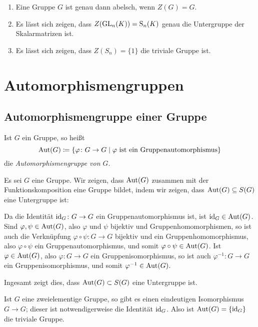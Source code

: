 \begin{bsp}
 \begin{enumerate}[leftmargin=*]
  \item
   Eine Gruppe $G$ ist genau dann abelsch, wenn $Z(G) = G$.
  \item
   Es lässt sich zeigen, dass $Z(\mathrm{GL}_n(K)) = \mathrm{S}_n(K)$ genau die Untergruppe der Skalarmatrizen ist.
  \item
   Es lässt sich zeigen, dass $Z(S_n) = \{1\}$ die triviale Gruppe ist.
 \end{enumerate}
\end{bsp}






\section{Automorphismengruppen}


\subsection{Automorphismengruppe einer Gruppe}
\begin{defi}
 Ist $G$ ein Gruppe, so heißt
 \[
  \mathrm{Aut}(G) \coloneqq \{\varphi \colon G \to G \mid \text{$\varphi$ ist ein Gruppenautomorphismus}\}
 \]
 die \emph{Automorphismengruppe von $G$}.
\end{defi}

Es sei $G$ eine Gruppe. Wir zeigen, dass $\mathrm{Aut}(G)$ zusammen mit der Funktionskomposition eine Gruppe bildet, indem wir zeigen, dass $\mathrm{Aut}(G) \subseteq S(G)$ eine Untergruppe ist:

Da die Identität $\mathrm{id}_G \colon G \to G$ ein Gruppenautomorphismus ist, ist $\mathrm{id}_G \in \mathrm{Aut}(G)$. Sind $\varphi, \psi \in \mathrm{Aut}(G)$, also $\varphi$ und $\psi$ bijektiv und Gruppenhomomorphismen, so ist auch die Verknüpfung $\varphi \circ \psi \colon G \to G$ bijektiv und ein Gruppenhomomorphismus, also $\varphi \circ \psi$ ein Gruppenautomorphismus, und somit $\varphi \circ \psi \in \mathrm{Aut}(G)$. Ist $\varphi \in \mathrm{Aut}(G)$, also $\varphi \colon G \to G$ ein Gruppenisomorphismus, so ist auch $\varphi^{-1} \colon G \to G$ ein Gruppenisomorphismus, und somit $\varphi^{-1} \in \mathrm{Aut}(G)$.

Ingesamt zeigt dies, dass $\mathrm{Aut}(G) \subset S(G)$ eine Untergruppe ist.

\begin{bsp}
 Ist $G$ eine zweielementige Gruppe, so gibt es einen eindeutigen Isomorphismus $G \to G$; dieser ist notwendigerweise die Identität $\mathrm{id}_G$. Also ist $\mathrm{Aut}(G) = \{\mathrm{id}_G\}$ die triviale Gruppe.
\end{bsp}

